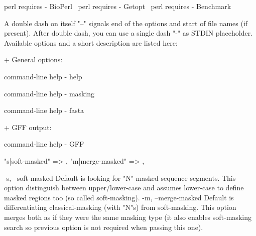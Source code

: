 \documentclass[11pt]{article}
\def\nwendcode{\endtrivlist \endgroup} %
\let\nwdocspar=\par                    %
\begin{document}
  \LA{}perl requires - BioPerl~{\nwtagstyle{}}\RA{}
  \LA{}perl requires - Getopt~{\nwtagstyle{}}\RA{}
  \LA{}perl requires - Benchmark~{\nwtagstyle{}}\RA{}
\nwendcode{}%

\nwenddocs{}\endmoddef
A double dash on itself "--" signals end of the options
and start of file names (if present). After double dash,
you can use a single dash "-" as STDIN placeholder. 
Available options and a short description are listed here:

+ General options:

  \LA{}command-line help - help~{\nwtagstyle{}}\RA{}

  \LA{}command-line help - masking~{\nwtagstyle{}}\RA{}

  \LA{}command-line help - fasta~{\nwtagstyle{}}\RA{}

+ GFF output:

  \LA{}command-line help - GFF~{\nwtagstyle{}}\RA{}
\nwendcode{}\nwdocspar


\nwenddocs{}\endmoddef
"s|soft-masked"  => ,
"m|merge-masked" => ,
\nwendcode{}\nwdocspar
\nwenddocs{}\endmoddef
-s, --soft-masked      Default is looking for "N" masked sequence
                       segments. This option distinguish between 
                       upper/lower-case and assumes lower-case to 
                       define masked regions too (so called soft-masking).
-m, --merge-masked     Default is differentiating classical-masking
                       (with "N"s) from soft-masking. This option merges
                       both as if they were the same masking type
                       (it also enables soft-masking search so previous 
                       option is not required when passing this one).
\nwendcode{}\nwdocspar
 
\end{document}
